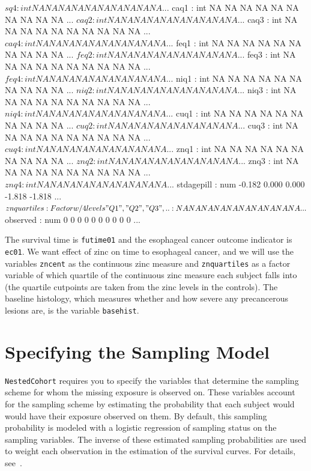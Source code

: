 \documentclass[10pt]{article}
\begin{document}
\begin{Schunk}
\begin{Soutput}
 $ sq4        : int  NA NA NA NA NA NA NA NA NA NA ...
 $ caq1       : int  NA NA NA NA NA NA NA NA NA NA ...
 $ caq2       : int  NA NA NA NA NA NA NA NA NA NA ...
 $ caq3       : int  NA NA NA NA NA NA NA NA NA NA ...
 $ caq4       : int  NA NA NA NA NA NA NA NA NA NA ...
 $ feq1       : int  NA NA NA NA NA NA NA NA NA NA ...
 $ feq2       : int  NA NA NA NA NA NA NA NA NA NA ...
 $ feq3       : int  NA NA NA NA NA NA NA NA NA NA ...
 $ feq4       : int  NA NA NA NA NA NA NA NA NA NA ...
 $ niq1       : int  NA NA NA NA NA NA NA NA NA NA ...
 $ niq2       : int  NA NA NA NA NA NA NA NA NA NA ...
 $ niq3       : int  NA NA NA NA NA NA NA NA NA NA ...
 $ niq4       : int  NA NA NA NA NA NA NA NA NA NA ...
 $ cuq1       : int  NA NA NA NA NA NA NA NA NA NA ...
 $ cuq2       : int  NA NA NA NA NA NA NA NA NA NA ...
 $ cuq3       : int  NA NA NA NA NA NA NA NA NA NA ...
 $ cuq4       : int  NA NA NA NA NA NA NA NA NA NA ...
 $ znq1       : int  NA NA NA NA NA NA NA NA NA NA ...
 $ znq2       : int  NA NA NA NA NA NA NA NA NA NA ...
 $ znq3       : int  NA NA NA NA NA NA NA NA NA NA ...
 $ znq4       : int  NA NA NA NA NA NA NA NA NA NA ...
 $ stdagepill : num  -0.182  0.000  0.000 -1.818 -1.818 ...
 $ znquartiles: Factor w/ 4 levels "Q1","Q2","Q3",..: NA NA NA NA NA NA NA NA NA NA ...
 $ observed   : num  0 0 0 0 0 0 0 0 0 0 ...
\end{Soutput}
\end{Schunk}

The survival time is \texttt{futime01} and the esophageal cancer outcome indicator is
\texttt{ec01}.  We want effect of zinc on time to esophageal cancer, and we will use the
variables \texttt{zncent} as the continuous zinc measure and \texttt{znquartiles} as a
factor variable of which quartile of the continuous zinc measure each subject falls into
(the quartile cutpoints are taken from the zinc levels in the controls).  The baseline
histology, which measures whether and how severe any precancerous lesions are, is the
variable \texttt{basehist}.


\section{Specifying the Sampling Model}
\label{sec:sampling-model}

\texttt{NestedCohort} requires you to specify the variables that determine the sampling
scheme for whom the missing exposure is observed on.  These variables account for the
sampling scheme by estimating the probability that each subject would would have their
exposure observed on them.  By default, this sampling probability is modeled with a
logistic regression of sampling status on the sampling variables.  The inverse of these
estimated sampling probabilities are used to weight each observation in the estimation of
the survival curves.  For details, see~\cite{Mark:Katki:06}.
\end{document}
